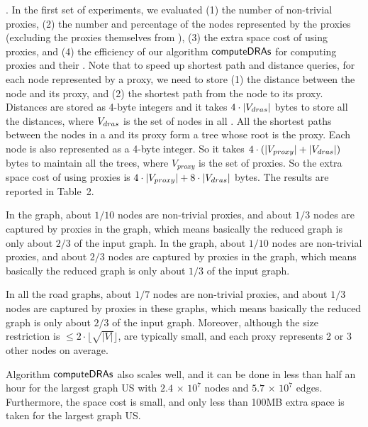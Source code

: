 . In the first set of experiments, we evaluated (1) the number of non-trivial proxies, (2) the number and percentage of the nodes represented by the proxies (excluding the proxies themselves from \dras), (3) the extra space cost of using proxies, and (4) the efficiency of our algorithm ${\mathsf{computeDRAs}}$ for computing proxies and their \dras. Note that to speed up shortest  path and distance queries, for each node represented by a proxy, we need to store (1) the distance between the node and its proxy, and (2) the shortest path from the node to its proxy. Distances are stored as 4-byte integers and it takes $4 \cdot |V_{{\sc dra}s}|$ bytes to store all the distances, where $V_{{\sc dra}s}$ is the set of nodes in all \dras. All the shortest paths between the nodes in a \dra and its proxy form a tree whose root is the proxy. Each node is also represented as a 4-byte integer. So it takes $ 4 \cdot (|V_{proxy}|+ |V_{{\sc dra}s}|) $ bytes to maintain all the trees, where $V_{proxy}$ is the set of proxies. So the extra space cost of using proxies is $4 \cdot |V_{proxy}| + 8 \cdot |V_{{\sc dra}s}|$ bytes. The results are reported in Table~2.

In the \dblp graph, about $1/10$ nodes are non-trivial proxies, and about $1/3$ nodes are captured by proxies in the graph, which means basically the reduced graph is only about $2/3$ of the input graph. In the \dblpone graph, about $1/10$ nodes are non-trivial proxies, and about $2/3$ nodes are captured by proxies in the graph, which means basically the reduced graph is only about $1/3$ of the input graph.





In all the road graphs,  about $1/7$ nodes are non-trivial proxies, and about $1/3$ nodes are captured by proxies in these graphs, which means basically the reduced graph is only about $2/3$ of the input graph. Moreover, although the size restriction is $\le 2\cdot\lfloor\sqrt{|V|}\rfloor$, \dras are typically small, and each proxy represents 2 or 3 other nodes on average.



Algorithm ${\mathsf{computeDRAs}}$ also scales well, and it can be done in less than half an hour for the largest graph US with $2.4$ $\times$ $10^7$ nodes and $5.7$ $\times$ $10^7$ edges. Furthermore, the space cost is small, and only less than 100MB extra space is taken for the largest graph US.




